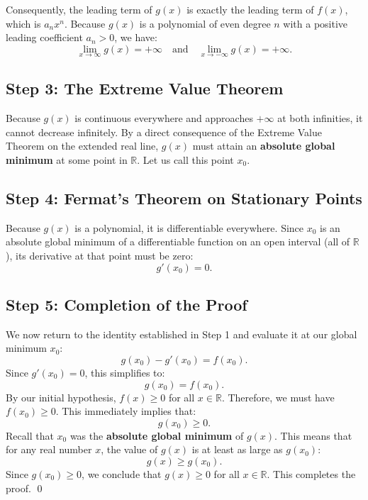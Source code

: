 \documentclass[12pt, a4paper]{article}
\begin{document}
Consequently, the leading term of $g(x)$ is exactly the leading term of $f(x)$, which is $a_n x^n$. Because $g(x)$ is a polynomial of even degree $n$ with a positive leading coefficient $a_n > 0$, we have:
\[
\lim_{x \to \infty} g(x) = +\infty \quad \text{and} \quad \lim_{x \to -\infty} g(x) = +\infty.
\]

\subsection*{Step 3: The Extreme Value Theorem}
Because $g(x)$ is continuous everywhere and approaches $+\infty$ at both infinities, it cannot decrease infinitely. By a direct consequence of the Extreme Value Theorem on the extended real line, $g(x)$ must attain an \textbf{absolute global minimum} at some point in $\mathbb{R}$. Let us call this point $x_0$.

\subsection*{Step 4: Fermat's Theorem on Stationary Points}
Because $g(x)$ is a polynomial, it is differentiable everywhere. Since $x_0$ is an absolute global minimum of a differentiable function on an open interval (all of $\mathbb{R}$), its derivative at that point must be zero:
\[
g'(x_0) = 0.
\]

\subsection*{Step 5: Completion of the Proof}
We now return to the identity established in Step 1 and evaluate it at our global minimum $x_0$:
\[
g(x_0) - g'(x_0) = f(x_0).
\]
Since $g'(x_0) = 0$, this simplifies to:
\[
g(x_0) = f(x_0).
\]
By our initial hypothesis, $f(x) \ge 0$ for all $x \in \mathbb{R}$. Therefore, we must have $f(x_0) \ge 0$. This immediately implies that:
\[
g(x_0) \ge 0.
\]
Recall that $x_0$ was the \textbf{absolute global minimum} of $g(x)$. This means that for any real number $x$, the value of $g(x)$ is at least as large as $g(x_0)$:
\[
g(x) \ge g(x_0).
\]
Since $g(x_0) \ge 0$, we conclude that $g(x) \ge 0$ for all $x \in \mathbb{R}$. This completes the proof. \qed
\end{document}
